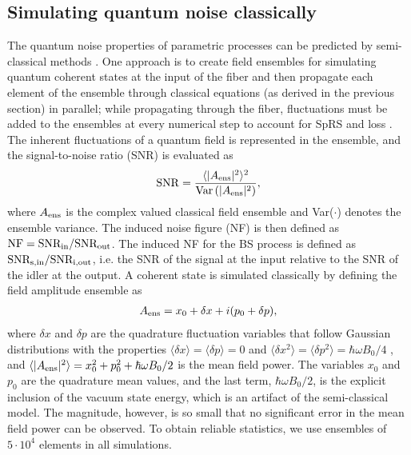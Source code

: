 \documentclass[10pt,letterpaper]{article}
\begin{document}
\subsection{Simulating quantum noise classically \label{sec_23}}
The quantum noise properties of parametric processes \cite{McK_2005b} can be predicted by semi-classical methods \cite{Gordon_1963}. One approach is to create field ensembles for simulating quantum coherent states at the input of the fiber and then propagate each element of the ensemble through classical equations (as derived in the previous section) in parallel; while propagating through the fiber, fluctuations must be added to the ensembles at every numerical step to account for SpRS and loss \cite{Friis_2013}. The inherent fluctuations of a quantum field is represented in the ensemble, and the signal-to-noise ratio (SNR) is evaluated as
\begin{eqnarray} \label{eq_36}
{\rm SNR} = \frac{\langle |A_{\rm ens}|^2 \rangle^2 }{{\rm Var} \left( |A_{\rm ens}|^2 \right)},
\end{eqnarray}
where $A_{\rm ens}$ is the complex valued classical field ensemble and Var($\cdot$) denotes the ensemble variance. The induced noise figure (NF) is then defined as $\rm NF = SNR_{in}/SNR_{out}$. The induced NF for the BS process is defined as $\rm SNR_{s,in}/SNR_{i,out}$, i.e. the SNR of the signal at the input relative to the SNR of the idler at the output. A coherent state is simulated classically by defining the field amplitude ensemble as
\begin{eqnarray} \label{eq_24}
A_{\rm ens} = x_0 + \delta x + i(p_0+\delta p),
\end{eqnarray}
where $\delta x$ and $\delta p$ are the quadrature fluctuation variables that follow Gaussian distributions with the properties $\langle \delta x \rangle=\langle \delta p \rangle = 0$ and $\langle \delta x^2 \rangle=\langle \delta p^2 \rangle = \hbar \omega B_0 /4$ \cite{Gerry}, and $\langle |A_{\rm ens}|^2 \rangle = x_0^2 + p_0^2 + \hbar \omega B_0/2$ is the mean field power. The variables $x_0$ and $p_0$ are the quadrature mean values, and the last term, $\hbar \omega B_0/2$, is the explicit inclusion of the vacuum state energy, which is an artifact of the semi-classical model. The magnitude, however, is so small that no significant error in the mean field power can be observed. To obtain reliable statistics, we use ensembles of $5\cdot 10^4$ elements in all simulations.
\end{document}
